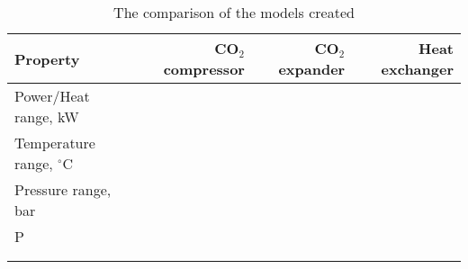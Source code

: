 \begin{table}
\label{tab:DiscussionComparison}
\caption{The comparison of the models created}
\begin{center}
\begin{tabulary}{0.9\textwidth}{LRRR}
\toprule
Property 	&	CO$_2$ compressor & CO$_2$	expander & Heat exchanger \\
\midrule
Power/Heat range, kW& & & \\
Temperature range, $^\circ$C& & & \\
Pressure range, bar& & & \\
P& & & \\
& & & \\
& & & \\
\bottomrule
\end{tabulary}
\end{center}
\end{table}
